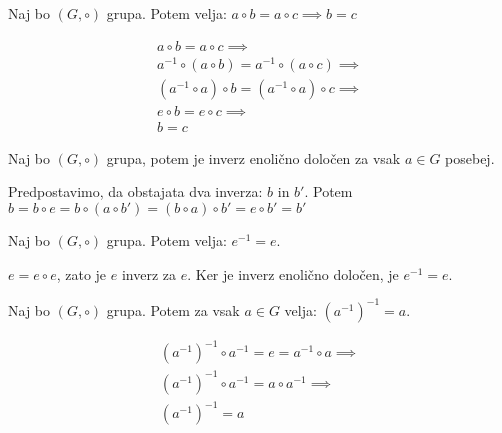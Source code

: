 \begin{trditev}
    Naj bo $(G, \circ)$ grupa.
    Potem velja: $a\circ b = a\circ c \implies b = c$
\end{trditev}
\begin{dokaz}
    \begin{align*}
        a\circ b = a\circ c \implies \\
        a^{-1} \circ (a \circ b) = a^{-1} \circ (a \circ c) \implies \\
        (a^{-1} \circ a) \circ b = (a^{-1} \circ a) \circ c \implies \\
        e \circ b = e \circ c \implies \\
        b = c
    \end{align*}
\end{dokaz}

\begin{trditev}
    Naj bo $(G, \circ)$ grupa, potem je inverz enolično določen za vsak $a \in G$ posebej.
\end{trditev}
\begin{dokaz}
    Predpostavimo, da obstajata dva inverza: $b$ in $b'$.
    Potem $b = b \circ e = b \circ (a \circ b') = (b \circ a) \circ b' = e \circ b' = b'$
\end{dokaz}

\begin{trditev}
    Naj bo $(G, \circ)$ grupa.
    Potem velja: $e^{-1} = e$.
\end{trditev}
\begin{dokaz}
    $e = e \circ e$, zato je $e$ inverz za $e$.
    Ker je inverz enolično določen, je $e^{-1} = e$.
\end{dokaz}

\begin{trditev}
    Naj bo $(G, \circ)$ grupa.
    Potem za vsak $a \in G$ velja: $(a^{-1})^{-1} = a$.
\end{trditev}
\begin{dokaz}
    \begin{align*}
        (a^{-1})^{-1} \circ a^{-1} = e = a^{-1} \circ a \implies \\
        (a^{-1})^{-1} \circ a^{-1} = a \circ a^{-1} \implies \\
        (a^{-1})^{-1} = a
    \end{align*}
\end{dokaz}

